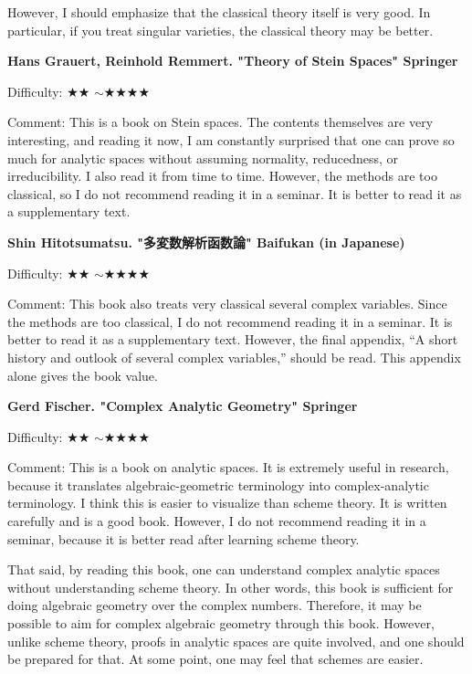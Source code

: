 However, I should emphasize that the classical theory itself is very good. In particular, if you treat singular varieties, the classical theory may  be better.
 \vspace{8pt}

\textbf{Hans Grauert, Reinhold Remmert. "Theory of Stein Spaces" Springer }  　\vspace{-6pt} 

Difficulty: ★★ $\sim$★★★★ 　\vspace{-6pt} 

Comment: This is a book on Stein spaces. The contents themselves are very interesting, and reading it now, I am constantly surprised that one can prove so much for analytic spaces without assuming normality, reducedness, or irreducibility. I also read it from time to time. However, the methods are too classical, so I do not recommend reading it in a seminar. It is better to read it as a supplementary text.
\vspace{8pt}

\textbf{Shin Hitotsumatsu. "多変数解析函数論" Baifukan (in Japanese)}  　\vspace{-6pt} 

Difficulty: ★★ $\sim$★★★★ 　\vspace{-6pt} 

Comment: This book also treats very classical several complex variables. Since the methods are too classical, I do not recommend reading it in a seminar. It is better to read it as a supplementary text. However, the final appendix, ``A short history and outlook of several complex variables,'' should be read. This appendix alone gives the book value.
\vspace{8pt}

\textbf{Gerd Fischer. "Complex Analytic Geometry" Springer}  　\vspace{-6pt} 

Difficulty: ★★ $\sim$★★★★ 　\vspace{-6pt} 

Comment: This is a book on analytic spaces. It is extremely useful in research, because it translates algebraic-geometric terminology into complex-analytic terminology. I think this is easier to visualize than scheme theory. It is written carefully and is a good book. However, I do not recommend reading it in a seminar, because it is better read after learning scheme theory.

That said, by reading this book, one can understand complex analytic spaces without understanding scheme theory. In other words, this book is sufficient for doing algebraic geometry over the complex numbers. Therefore, it may be possible to aim for complex algebraic geometry through this book. However, unlike scheme theory, proofs in analytic spaces are quite involved, and one should be prepared for that. At some point, one may feel that schemes are easier.
\vspace{8pt}

